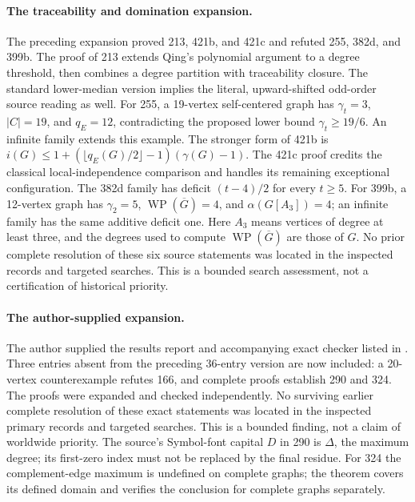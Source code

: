 \documentclass[11pt,a4paper]{article}
\theoremstyle{remark}
\begin{document}
\paragraph{The traceability and domination expansion.}
The preceding expansion proved 213, 421b, and 421c and refuted 255, 382d, and 399b.
The proof of 213 extends Qing's polynomial argument to a degree threshold,
then combines a degree partition with traceability closure. The standard
lower-median version implies the literal, upward-shifted odd-order source
reading as well. For 255, a 19-vertex self-centered graph has
$\gamma_t=3$, $|C|=19$, and $q_E=12$, contradicting the proposed
lower bound $\gamma_t\ge19/6$. An infinite family extends this example.
The stronger form of 421b is
$i(G)\le 1+(\lfloor q_E(G)/2\rfloor-1)(\gamma(G)-1)$.
The 421c proof credits the classical local-independence comparison and
handles its remaining exceptional configuration. The 382d family has
deficit $(t-4)/2$ for every $t\ge5$. For 399b, a 12-vertex graph has
$\gamma_2=5$, $\operatorname{WP}(\overline G)=4$, and
$\alpha(G[A_3])=4$; an infinite family has the same additive deficit one.
Here $A_3$ means vertices of degree at least three, and the degrees used
to compute $\operatorname{WP}(\overline G)$ are those of $G$.
No prior complete resolution of these six source statements was located
in the inspected records and targeted searches. This is a bounded search
assessment, not a certification of historical priority.

\paragraph{The author-supplied expansion.}
The author supplied the results report and accompanying exact checker
listed in \cite{UserNotes,UserCode}. Three entries absent from the preceding
36-entry version are now included: a 20-vertex counterexample refutes 166,
and complete proofs establish 290 and 324. The proofs were expanded and
checked independently. No surviving earlier complete resolution of these
exact statements was located in the inspected primary records and targeted
searches. This is a bounded finding, not a claim of worldwide priority.
The source's Symbol-font capital $D$ in 290 is $\Delta$, the maximum degree;
its first-zero index must not be replaced by the final residue.
For 324 the complement-edge maximum is undefined on complete graphs;
the theorem covers its defined domain and verifies the conclusion for
complete graphs separately.
\end{document}
